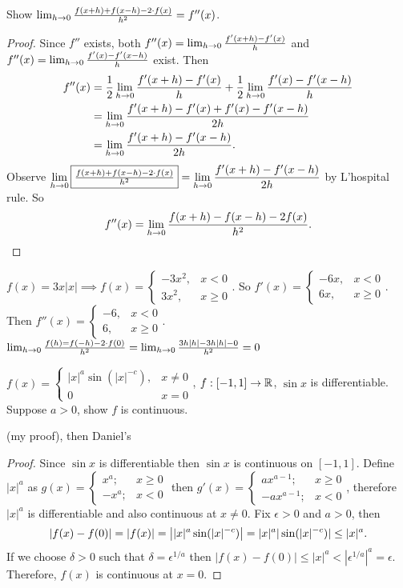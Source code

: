 \documentclass[]{article}
\begin{document}
\iffalse
\begin{example}
Show $\lim_{h\rightarrow0} \frac{f(x+h)+f(x-h)-2\cdot f(x)}{h^2} = f''(x)$.
\end{example}
\begin{proof}
	Since $f''$ exists, both $f''(x) = \lim_{h\rightarrow0} \frac{f'(x+h)-f'(x)}h$ and $f''(x) = \lim_{h\rightarrow0} \frac{f'(x)-f'(x-h)}h$ exist.
	Then 
	\begin{align*}
		f''(x) &= \frac12 \lim_{h\rightarrow0} \frac{f'(x+h)-f'(x)}h + \frac12 \lim_{h\rightarrow0} \frac{f'(x)-f'(x-h)}h \\
			   &= \lim_{h\rightarrow0} \frac{f'(x+h)-f'(x)+f'(x)-f'(x-h)}{2h} \\
			   &= \lim_{h\rightarrow0} \frac{f'(x+h)-f'(x-h)}{2h}.
	\end{align*}
	Observe $\displaystyle\lim_{h\rightarrow0} \fbox{$\frac{f(x+h)+f(x-h)-2\cdot f(x)}{h^2}$} = \lim_{h\rightarrow0} \frac{f'(x+h)-f'(x-h)}{2h}$ by L'hospital rule.
	So $$ f''(x) = \lim_{h\rightarrow0} \frac{f(x+h)-f(x-h)-2f(x)}{h^2}.$$
\end{proof}
\begin{example}
	$f(x) = 3x|x| \implies f(x) = \begin{cases} -3x^2, & x<0 \\ 3x^2, & x\geq 0 \end{cases}$.
	So $f'(x) = \begin{cases} -6x, & x<0 \\ 6x, & x\geq0 \end{cases}$.
	Then $f''(x) = \begin{cases} -6, & x<0 \\ 6, & x\geq 0 \end{cases}$.
	$\lim_{h\rightarrow0} \frac{f(h)=f(-h)-2\cdot f(0)}{h^2} = \lim_{h\rightarrow0} \frac{3h|h|-3h|h|-0}{h^2} = 0$
\end{example}


\begin{example}
	$f(x) = \begin{cases} |x|^a \sin(|x|^{-c}), & x\neq 0 \\ 0 & x=0 \end{cases}$, $f:[-1,1]\rightarrow\mathbb{R}$, $\sin x$ is differentiable. Suppose $a>0$, show $f$ is continuous.
\end{example}
(my proof), then Daniel's
\begin{proof}
	Since $\sin x$ is differentiable then $\sin x$ is continuous on $[-1,1]$.
	Define $|x|^a$ as $g(x) = \begin{cases} x^a; & x\geq 0 \\ -x^a; & x<0 \end{cases}$ then $g'(x) = \begin{cases} ax^{a-1}; & x\geq0 \\ -ax^{a-1}; & x<0 \end{cases}$, therefore $|x|^a$ is differentiable and also continuous at $x\neq0$.
	Fix $\epsilon>0$ and $a>0$, then
	$$ |f(x)-f(0)| = |f(x)| = \left| |x|^a \sin(|x|^{-c})\right| = |x|^a |\sin(|x|^{-c})| \leq |x|^a.$$
	If we choose $\delta>0$ such that $\delta = \epsilon^{1/a}$ then $|f(x)-f(0)| \leq |x|^a < |\epsilon^{1/a}|^a = \epsilon$.
	Therefore, $f(x)$ is continuous at $x=0$.
\end{proof}
\end{document}
